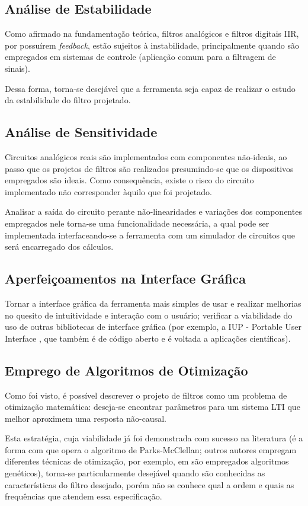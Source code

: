 \subsection{Análise de Estabilidade}
Como afirmado na fundamentação teórica, filtros analógicos e filtros digitais IIR, por possuírem \textit{feedback}, estão sujeitos à instabilidade, principalmente quando são empregados em sistemas de controle (aplicação comum para a filtragem de sinais).

Dessa forma, torna-se desejável que a ferramenta seja capaz de realizar o estudo da estabilidade do filtro projetado. 

\subsection{Análise de Sensitividade}
Circuitos analógicos reais são implementados com componentes não-ideais, ao passo que os projetos de filtros são realizados presumindo-se que os dispositivos empregados são ideais. Como consequência, existe o risco do circuito implementado não corresponder àquilo que foi projetado. 

Analisar a saída do circuito perante não-linearidades e variações dos componentes empregados nele torna-se uma funcionalidade necessária, a qual pode ser implementada interfaceando-se a ferramenta com um simulador de circuitos que será encarregado dos cálculos. 

\subsection{Aperfeiçoamentos na Interface Gráfica}
Tornar a interface gráfica da ferramenta mais simples de usar e realizar melhorias no quesito de intuitividade e interação com o usuário; verificar a viabilidade do uso de outras bibliotecas de interface gráfica (por exemplo, a IUP - Portable User Interface \cite{iup}, que também é de código aberto e é voltada a aplicações científicas).

\subsection{Emprego de Algoritmos de Otimização}
Como foi visto, é possível descrever o projeto de filtros como um problema de otimização matemática: deseja-se encontrar parâmetros para um sistema LTI que melhor aproximem uma resposta não-causal. 

Esta estratégia, cuja viabilidade já foi demonstrada com sucesso na literatura (é a forma com que opera o algoritmo de Parks-McClellan; outros autores empregam diferentes técnicas de otimização, por exemplo, em \cite{barros} são empregados algoritmos genéticos), torna-se particularmente desejável quando são conhecidas as características do filtro desejado, porém não se conhece qual a ordem e quais as frequências que atendem essa especificação.

